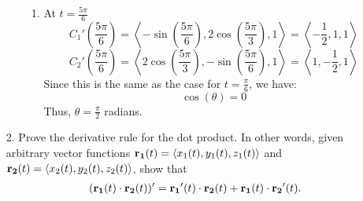 \documentclass[reqno, 12pt]{amsart}
\begin{document}
\begin{itemize}
\begin{itemize}
\begin{answerbox}
\begin{enumerate}
            \item At \( t = \frac{5\pi}{6} \)
              \[
                C_1'\left(\frac{5\pi}{6}\right) = \left\langle -\sin\left(\frac{5\pi}{6}\right), 2\cos\left(\frac{5\pi}{3}\right), 1 \right\rangle = \left\langle -\frac{1}{2}, 1, 1 \right\rangle
              \]
              \[
                C_2'\left(\frac{5\pi}{6}\right) = \left\langle 2\cos\left(\frac{5\pi}{3}\right), -\sin\left(\frac{5\pi}{6}\right), 1 \right\rangle = \left\langle 1, -\frac{1}{2}, 1 \right\rangle
              \]
              Since this is the same as the case for \( t = \frac{\pi}{6} \), we have:
              \[
                \cos(\theta) = 0
              \]
              Thus, \( \theta = \frac{\pi}{2} \) radians.
          \end{enumerate}
        \end{answerbox}
        \vspace{0.5 in}
    \end{itemize}

  \item[2.] Prove the derivative rule for the dot product. In other words, given arbitrary vector functions ${\bf r_1}(t) = \langle x_1(t), y_1(t), z_1(t)\rangle$ and ${\bf r_2}(t) = \langle x_2(t), y_2(t), z_2(t)\rangle$, show that
    \begin{align*}
      ({\bf r_1}(t)\cdot{\bf r_2}(t))' = {\bf r_1}'(t)\cdot{\bf r_2}(t) + {\bf r_1}(t)\cdot{\bf r_2}'(t).
    \end{align*}
    \newline


\end{itemize}
\end{document}
